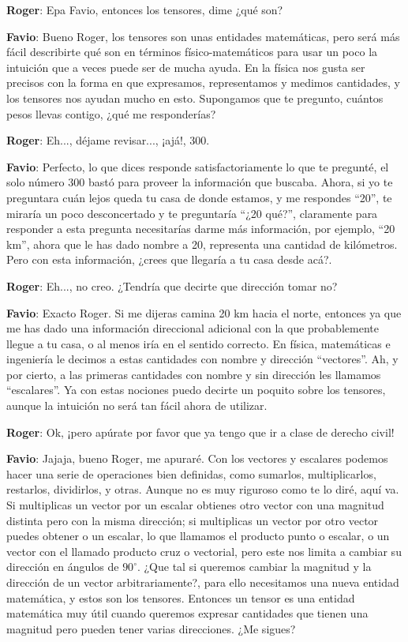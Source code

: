 \documentclass[a4paper,10pt]{article}
\numberwithin{equation}{section}
\begin{document}
\vspace{.3cm}

\textbf{\color{ForestGreen}Roger}: Epa Favio, entonces los tensores, dime ¿qué son?

\textbf{\color{Blue}Favio}: Bueno Roger, los tensores son unas entidades matemáticas, pero
será más fácil describirte qué son en términos físico-matemáticos para usar un poco la 
intuición que a veces puede ser de mucha ayuda. En la física nos gusta ser precisos con 
la forma en que expresamos, representamos y medimos cantidades, y los tensores nos ayudan
mucho en esto. Supongamos que te pregunto, cuántos pesos llevas contigo, ¿qué me responderías?

\textbf{\color{ForestGreen}Roger}: Eh..., déjame revisar..., ¡ajá!, 300.

\textbf{\color{Blue}Favio}: Perfecto, lo que dices responde satisfactoriamente lo que te 
pregunté, el solo número 300 bastó para proveer la información que buscaba. Ahora, si yo
te preguntara cuán lejos queda tu casa de donde estamos, y me respondes ``20'', te miraría
un poco desconcertado y te preguntaría ``¿20 qué?'', claramente para responder a esta 
pregunta necesitarías darme más información, por ejemplo, ``20 km'', ahora que le has 
dado nombre a 20, representa una cantidad de kilómetros. Pero con esta información, 
¿crees que llegaría a tu casa desde acá?.

\textbf{\color{ForestGreen}Roger}: Eh..., no creo. ¿Tendría que decirte que dirección tomar no?

\textbf{\color{Blue}Favio}: Exacto Roger. Si me dijeras camina 20 km hacia el norte, entonces 
ya que me has dado una información direccional adicional con la que probablemente llegue a tu casa,
o al menos iría en el sentido correcto. En física, matemáticas e ingeniería le decimos 
a estas cantidades con nombre y dirección ``vectores''. Ah, y por cierto, a las primeras 
cantidades con nombre y sin dirección les llamamos ``escalares''. Ya con estas nociones 
puedo decirte un poquito sobre los tensores, aunque la intuición no será tan fácil
ahora de utilizar.

\textbf{\color{ForestGreen}Roger}: Ok, ¡pero apúrate por favor que ya tengo que ir a clase de 
derecho civil!

\textbf{\color{Blue}Favio}: Jajaja, bueno Roger, me apuraré. Con los vectores y escalares
podemos hacer una serie de operaciones bien definidas, como sumarlos, multiplicarlos, restarlos,
dividirlos, y otras. Aunque no es muy riguroso como te lo diré, aquí va. Si multiplicas 
un vector por un escalar obtienes otro vector con una magnitud distinta pero con 
la misma dirección; si multiplicas un vector por otro vector puedes obtener o un escalar,
lo que llamamos el producto punto o escalar, o un vector con el llamado producto cruz o 
vectorial, pero este nos limita a cambiar su dirección en ángulos de $90^\circ$. ¿Que tal 
si queremos cambiar la magnitud y la dirección de un vector arbitrariamente?, para ello
necesitamos una nueva entidad matemática, y estos son los tensores. Entonces un tensor 
es una entidad matemática muy útil cuando queremos expresar cantidades que tienen una 
magnitud pero pueden tener varias direcciones. ¿Me sigues?
\end{document}

